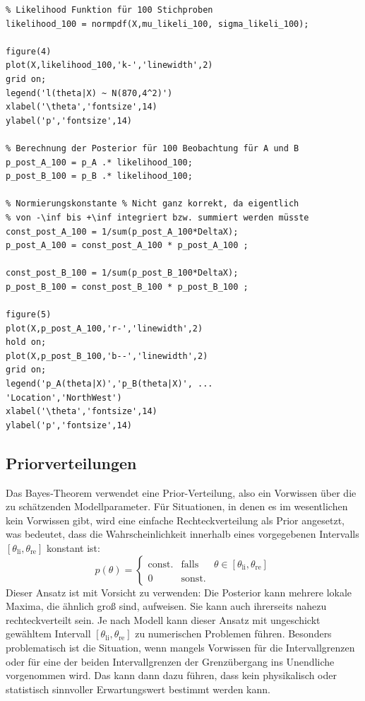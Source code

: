 \begin{verbatim}
% Likelihood Funktion für 100 Stichproben
likelihood_100 = normpdf(X,mu_likeli_100, sigma_likeli_100);

figure(4)
plot(X,likelihood_100,'k-','linewidth',2)
grid on;
legend('l(theta|X) ~ N(870,4^2)')
xlabel('\theta','fontsize',14)
ylabel('p','fontsize',14)

% Berechnung der Posterior für 100 Beobachtung für A und B
p_post_A_100 = p_A .* likelihood_100;
p_post_B_100 = p_B .* likelihood_100;

% Normierungskonstante % Nicht ganz korrekt, da eigentlich 
% von -\inf bis +\inf integriert bzw. summiert werden müsste
const_post_A_100 = 1/sum(p_post_A_100*DeltaX);
p_post_A_100 = const_post_A_100 * p_post_A_100 ;

const_post_B_100 = 1/sum(p_post_B_100*DeltaX);
p_post_B_100 = const_post_B_100 * p_post_B_100 ;

figure(5)
plot(X,p_post_A_100,'r-','linewidth',2)
hold on;
plot(X,p_post_B_100,'b--','linewidth',2)
grid on;
legend('p_A(theta|X)','p_B(theta|X)', ...
'Location','NorthWest')
xlabel('\theta','fontsize',14)
ylabel('p','fontsize',14)
\end{verbatim} 
\newpage
\subsection{Priorverteilungen}
Das Bayes-Theorem verwendet eine Prior-Verteilung, also ein Vorwissen über die zu schätzenden Modellparameter.
Für Situationen, in denen es im wesentlichen kein Vorwissen gibt, wird eine einfache Rechteckverteilung als Prior angesetzt, was bedeutet, dass die Wahrscheinlichkeit innerhalb eines vorgegebenen Intervalls $[\theta_\mathrm{li},\theta_\mathrm{re}]$ konstant ist:
\[
p(\theta) = \left\{\begin{array}{lll}
\textrm{const.} & \textrm{falls} & \theta \in [\theta_\mathrm{li},\theta_\mathrm{re}]\\
0 & \textrm{sonst.} &
\end{array}\right.
\]
Dieser Ansatz ist mit Vorsicht zu verwenden:
Die Posterior kann mehrere lokale Maxima, die ähnlich groß sind, aufweisen.
Sie kann auch ihrerseits nahezu rechteckverteilt sein.
Je nach Modell kann dieser Ansatz mit ungeschickt gewähltem Intervall
$[\theta_\mathrm{li},\theta_\mathrm{re}]$ zu numerischen Problemen führen.
Besonders problematisch ist die Situation, wenn mangels Vorwissen für die Intervallgrenzen
oder für eine der beiden Intervallgrenzen der Grenzübergang ins Unendliche vorgenommen wird.
Das kann dann dazu führen, dass kein physikalisch oder statistisch sinnvoller
Erwartungswert bestimmt werden kann. 

